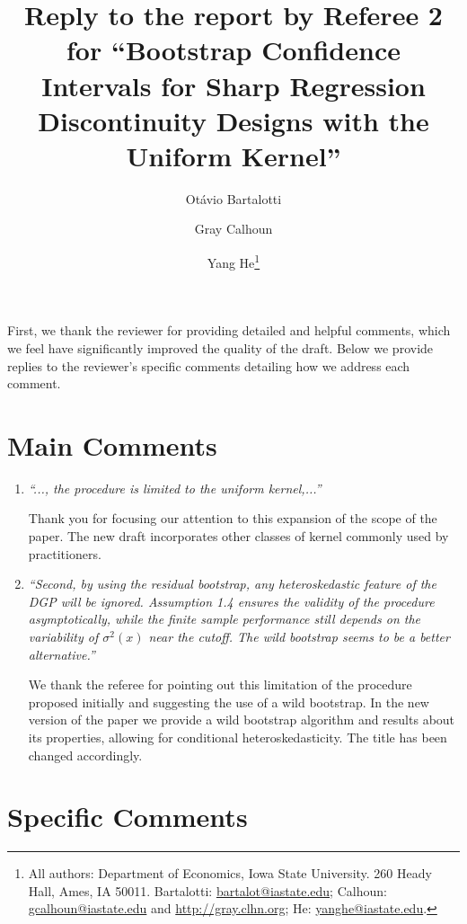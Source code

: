 \documentclass[12pt,fleqn]{article}
\title{Reply to the report by Referee 2 for ``Bootstrap Confidence Intervals for Sharp Regression Discontinuity Designs
  with the Uniform Kernel''}
\author{Ot\'avio Bartalotti \and Gray Calhoun \and Yang He\thanks{%
  All authors: Department of Economics, Iowa State University.
  260 Heady Hall, Ames, IA 50011.
  Bartalotti: \protect\url{bartalot@iastate.edu};
  Calhoun: \protect\url{gcalhoun@iastate.edu} and
  \protect\url{http://gray.clhn.org};
  He: \protect\url{yanghe@iastate.edu}.}}
\begin{document}
\maketitle

First, we thank the reviewer for providing detailed and helpful comments, which we feel have significantly improved the quality of the draft.  Below we provide replies to the reviewer’s specific comments detailing how we address each comment.

\section{Main Comments}

\begin{enumerate}

\item \textit{``..., the procedure is limited to the uniform kernel,...''}

 Thank you for focusing our attention to this expansion of the scope of the paper. The new draft incorporates other classes of kernel commonly used by practitioners.

 \item \textit{``Second, by using the residual bootstrap, any heteroskedastic feature of the DGP will be ignored. Assumption 1.4 ensures the validity of the procedure asymptotically, while the finite sample performance still depends on the variability of $\sigma^{2}(x)$ near the cutoff. The wild bootstrap seems to be a better alternative.''}

  We thank the referee for pointing out this limitation of the procedure proposed initially and suggesting the use of a wild bootstrap. In the new version of the paper we provide a wild bootstrap algorithm and results about its properties, allowing for conditional heteroskedasticity. The title has been changed accordingly.

\end{enumerate}

\section{Specific Comments}
\end{document}

